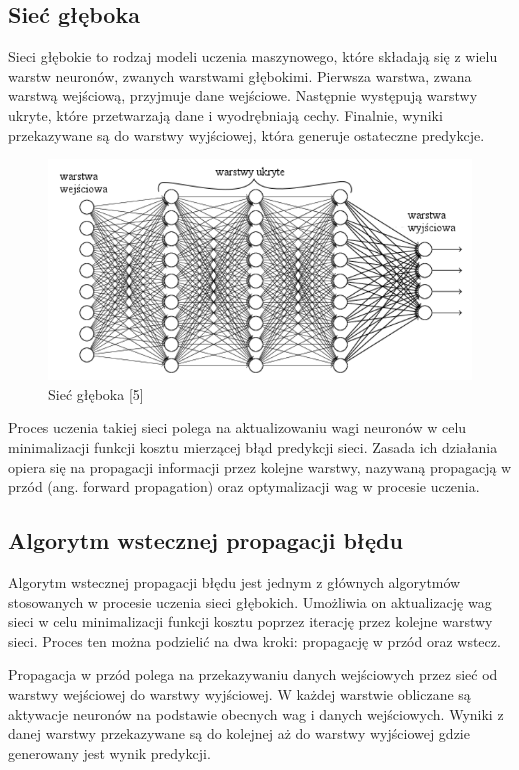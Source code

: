 \documentclass{article}
\begin{document}
\subsection{Sieć głęboka}
Sieci głębokie to rodzaj modeli uczenia maszynowego, które składają się z wielu warstw neuronów, zwanych warstwami głębokimi.
Pierwsza warstwa, zwana warstwą wejściową, przyjmuje dane wejściowe.
Następnie występują warstwy ukryte, które przetwarzają dane i wyodrębniają cechy.
Finalnie, wyniki przekazywane są do warstwy wyjściowej, która generuje ostateczne predykcje.
\begin{figure}[H]
    \centering
    \includegraphics[width=1\textwidth, keepaspectratio]{siec_gleboka.png}
    \caption{Sieć głęboka [5]}
    \label{fig:siec}
\end{figure}
Proces uczenia takiej sieci polega na aktualizowaniu wagi neuronów w celu minimalizacji funkcji kosztu mierzącej błąd predykcji sieci.
Zasada ich działania opiera się na propagacji informacji przez kolejne warstwy, nazywaną propagacją w przód (ang. forward propagation) oraz optymalizacji wag w procesie uczenia.



\subsection{Algorytm wstecznej propagacji błędu}
Algorytm wstecznej propagacji błędu jest jednym z głównych algorytmów stosowanych w procesie uczenia sieci głębokich.
Umożliwia on aktualizację wag sieci w celu minimalizacji funkcji kosztu poprzez iterację przez kolejne warstwy sieci.
Proces ten można podzielić na dwa kroki: propagację w przód oraz wstecz.

Propagacja w przód polega na przekazywaniu danych wejściowych przez sieć od warstwy wejściowej do warstwy wyjściowej.
W każdej warstwie obliczane są aktywacje neuronów na podstawie obecnych wag i danych wejściowych.
Wyniki z danej warstwy przekazywane są do kolejnej aż do warstwy wyjściowej gdzie generowany jest wynik predykcji.
\end{document}
